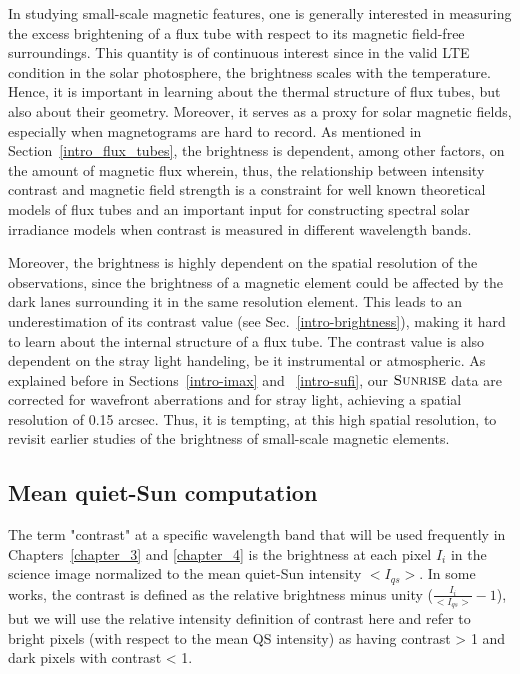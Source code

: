 \documentclass[goettingen, gauss, print]{thesis}
\begin{document}
In studying small-scale magnetic features, one is generally interested in measuring the excess brightening of a flux tube with respect to its magnetic field-free surroundings. This quantity is of continuous interest since in the valid LTE condition in the solar photosphere, the brightness scales with the temperature. Hence, it is important in learning about the thermal structure of flux tubes, but also about their geometry. Moreover, it serves as a proxy for solar magnetic fields, especially when magnetograms are hard to record. As mentioned in Section~\ref{intro_flux_tubes}, the brightness is dependent, among other factors, on the amount of magnetic flux wherein, thus, the relationship between intensity contrast and magnetic field strength is a constraint for well known theoretical models of flux tubes and an important input for constructing spectral solar irradiance models when contrast is measured in different wavelength bands. 

Moreover, the brightness is highly dependent on the spatial resolution of the observations, since the brightness of a magnetic element could be affected by the dark lanes surrounding it in the same resolution element. This leads to an underestimation of its contrast value (see Sec.~\ref{intro-brightness}), making it hard to learn about the internal structure of a flux tube. The contrast value is also dependent on the stray light handeling, be it instrumental or atmospheric. As explained before in Sections~\ref{intro-imax} and ~\ref{intro-sufi}, our $\textsc{Sunrise}$ data are corrected for wavefront aberrations and for stray light, achieving a spatial resolution of 0.15 arcsec. Thus, it is tempting, at this high spatial resolution, to revisit earlier studies of the brightness of small-scale magnetic elements. 

\subsection{Mean quiet-Sun computation}

The term "contrast" at a specific wavelength band that will be used frequently in Chapters~\ref{chapter_3} and \ref{chapter_4} is the brightness at each pixel $I_{i}$ in the science image normalized to the mean quiet-Sun intensity $<I_{qs}>$. In some works, the contrast is defined as the relative brightness minus unity ($\frac{I_i}{<I_{qs}>}-1$), but we will use the relative intensity  definition of contrast here and refer to bright pixels (with respect to the mean QS intensity) as having contrast > 1 and dark pixels with contrast < 1.
\end{document}

